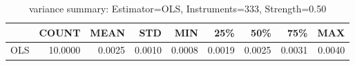 \begin{table}[ht]
\centering
\caption{variance summary: Estimator=OLS, Instruments=333, Strength=0.50}
\begin{tabular}{lrrrrrrrr}
\toprule
 & COUNT & MEAN & STD & MIN & 25\% & 50\% & 75\% & MAX \\
\midrule
OLS & 10.0000 & 0.0025 & 0.0010 & 0.0008 & 0.0019 & 0.0025 & 0.0031 & 0.0040 \\
\bottomrule
\end{tabular}
\end{table}
